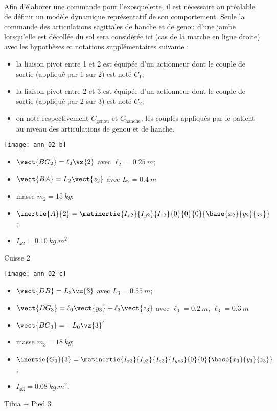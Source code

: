 Afin d'élaborer une commande pour l'exosquelette, il est nécessaire au préalable de définir un modèle dynamique représentatif de son comportement. Seule la commande des articulations sagittales de hanche et de genou d'une jambe lorsqu'elle est décollée du sol %
sera considérée ici (cas de la marche en ligne droite) avec les hypothèses et notations supplémentaires suivante :
\begin{itemize}
  \item la liaison pivot entre 1 et 2 est équipée d'un actionneur dont le couple de sortie (appliqué par 1 sur 2) est noté $C_{1}$;
  \item la liaison pivot entre 2 et 3 est équipée d'un actionneur dont le couple de sortie (appliqué par 2 sur 3) est noté $C_{2}$;
  \item on note respectivement $C_{\text {genou}}$ et $C_{\text {hanche}}$, les couples appliqués par le patient au niveau des articulations de genou et de hanche.
\end{itemize}

\begin{marginfigure}[-5cm]
\centering
\texttt{[image: ann\_02\_b]}
\begin{itemize}
\item $\vect{BG_2}=\ell_2\vz{2}$ avec $\ell_2 = \SI{0,25}{m}$;
\item $\vect{BA} = L_2 \vect{z_2}$ avec $L_2 = \SI{0,4}{m}$
\item masse $m_2 =\SI{15}{kg}$;
\item $\inertie{A}{2}=\matinertie{I_{x2}}{I_{y2}}{I_{z2}}{0}{0}{0}{\base{x_2}{y_2}{z_2}}$;
\item $I_{x2} = \SI{0,10}{kg.m^2}$.
\end{itemize}
\caption{Cuisse 2 \label{Cy_04_03_PFD_CO_TD_01_ann_02_b}}
\end{marginfigure}

\begin{marginfigure}[6cm]
\centering
\texttt{[image: ann\_02\_c]}
\begin{itemize}
\item $\vect{DB}=L_3\vz{3}$ avec $L_3 = \SI{0,55}{m}$;
\item $\vect{DG_3} = \ell_0 \vect{y_3}+\ell_3 \vect{z_3}$ avec $\ell_0 = \SI{0,2}{m}$, $\ell_3 = \SI{0,3}{m}$
\item $\vect{BG_3}=-L_0\vz{3}'$
\item masse $m_3 =\SI{18}{kg}$;
\item $\inertie{G_3}{3}=\matinertie{I_{x3}}{I_{y3}}{I_{z3}}{I_{yz3}}{0}{0}{\base{x_3}{y_3}{z_3}}$;
\item $I_{x3} = \SI{0,08}{kg.m^2}$.
\end{itemize}
\caption{Tibia + Pied 3 \label{Cy_04_03_PFD_CO_TD_01_ann_02_c}}
\end{marginfigure}
\fi

